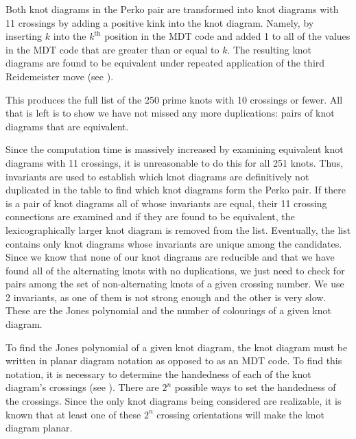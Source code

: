 \begin{paper}

Both knot diagrams in the Perko pair are transformed into knot diagrams with 11
crossings by adding a positive kink into the knot diagram.
Namely, by inserting $k$ into the $k^\text{th}$ position in the MDT code and
added 1 to all of the values in the MDT code that are greater than or equal to
$k$.
The resulting knot diagrams are found to be equivalent under repeated
application of the third Reidemeister move (see \figMoves).


This produces the full list of the 250 prime knots with 10 crossings or fewer.
All that is left is to show we have not missed any more duplications: pairs of
knot diagrams that are equivalent.


Since the computation time is massively increased by examining equivalent knot
diagrams with 11 crossings, it is unreasonable to do this for all 251 knots.
Thus, invariants are used to establish which knot diagrams are definitively not
duplicated in the table to find which knot diagrams form the Perko pair.
If there is a pair of knot diagrams all of whose invariants are equal, their 11
crossing connections are examined and if they are found to be equivalent, the
lexicographically larger knot diagram is removed from the list.
Eventually, the list contains only knot diagrams whose invariants are unique
among the candidates.
Since we know that none of our knot diagrams are reducible and that we have
found all of the alternating knots with no duplications, we just need to check
for pairs among the set of non-alternating knots of a given crossing number.
We use 2 invariants, as one of them is not strong enough and the other is very
slow.
These are the Jones polynomial and the number of colourings of a given knot
diagram.



To find the Jones polynomial of a given knot diagram, the knot diagram must be
written in planar diagram notation as opposed to as an MDT code.
To find this notation, it is necessary to determine the handedness of each of
the knot diagram's crossings (see \figCrossings).
There are $2^n$ possible ways to set the handedness of the crossings.
Since the only knot diagrams being considered are realizable, it is known that
at least one of these $2^n$ crossing orientations will make the knot diagram
planar.


\end{paper}
